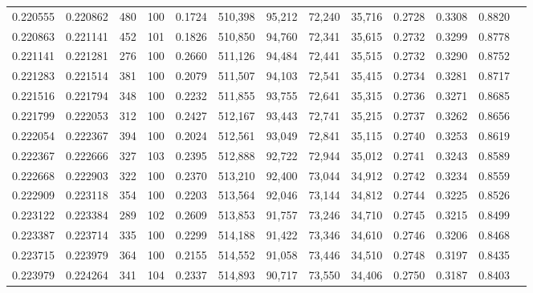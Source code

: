 \begin{tabular}{rrrrrrrrrrrrr}
0.220555 & 0.220862 &   480 & 100 &                                     0.1724 & 510,398 &  95,212 &  72,240 &  35,716 & 0.2728 & 0.3308 & 0.8820 \\
0.220863 & 0.221141 &   452 & 101 &                                     0.1826 & 510,850 &  94,760 &  72,341 &  35,615 & 0.2732 & 0.3299 & 0.8778 \\
0.221141 & 0.221281 &   276 & 100 &                                     0.2660 & 511,126 &  94,484 &  72,441 &  35,515 & 0.2732 & 0.3290 & 0.8752 \\
0.221283 & 0.221514 &   381 & 100 &                                     0.2079 & 511,507 &  94,103 &  72,541 &  35,415 & 0.2734 & 0.3281 & 0.8717 \\
0.221516 & 0.221794 &   348 & 100 &                                     0.2232 & 511,855 &  93,755 &  72,641 &  35,315 & 0.2736 & 0.3271 & 0.8685 \\
0.221799 & 0.222053 &   312 & 100 &                                     0.2427 & 512,167 &  93,443 &  72,741 &  35,215 & 0.2737 & 0.3262 & 0.8656 \\
0.222054 & 0.222367 &   394 & 100 &                                     0.2024 & 512,561 &  93,049 &  72,841 &  35,115 & 0.2740 & 0.3253 & 0.8619 \\
0.222367 & 0.222666 &   327 & 103 &                                     0.2395 & 512,888 &  92,722 &  72,944 &  35,012 & 0.2741 & 0.3243 & 0.8589 \\
0.222668 & 0.222903 &   322 & 100 &                                     0.2370 & 513,210 &  92,400 &  73,044 &  34,912 & 0.2742 & 0.3234 & 0.8559 \\
0.222909 & 0.223118 &   354 & 100 &                                     0.2203 & 513,564 &  92,046 &  73,144 &  34,812 & 0.2744 & 0.3225 & 0.8526 \\
0.223122 & 0.223384 &   289 & 102 &                                     0.2609 & 513,853 &  91,757 &  73,246 &  34,710 & 0.2745 & 0.3215 & 0.8499 \\
0.223387 & 0.223714 &   335 & 100 &                                     0.2299 & 514,188 &  91,422 &  73,346 &  34,610 & 0.2746 & 0.3206 & 0.8468 \\
0.223715 & 0.223979 &   364 & 100 &                                     0.2155 & 514,552 &  91,058 &  73,446 &  34,510 & 0.2748 & 0.3197 & 0.8435 \\
0.223979 & 0.224264 &   341 & 104 &                                     0.2337 & 514,893 &  90,717 &  73,550 &  34,406 & 0.2750 & 0.3187 & 0.8403 \\

\end{tabular}
